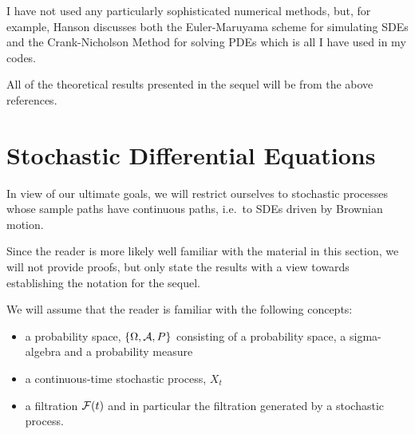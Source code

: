 \documentclass{article}
\begin{document}
I have not used any particularly sophisticated numerical
methods, but, for example, Hanson \cite{Hanson2007} discusses both the
Euler-Maruyama scheme for simulating SDEs and the Crank-Nicholson Method for
solving PDEs which is all I have used in my codes.

All of the theoretical results presented in the sequel will be from
the above references. 

\section{Stochastic Differential Equations}
In view of our ultimate goals, we will restrict ourselves to  stochastic
processes whose sample paths have continuous paths, i.e.\ to SDEs driven by
Brownian motion. 

Since the reader is more likely well familiar with the material in this section,
we will not provide proofs, but only state the results with a view towards
establishing the notation for the sequel.

We will assume that the reader is familiar with the following concepts:
\begin{itemize} 
  \item a probability space, $\{{\Omega}, { \mathcal{A} }, P\}$ consisting of a
  probability space, a sigma-algebra and a probability measure
  \item a continuous-time stochastic process, $X_t$
  \item a filtration ${\mathcal{F}}(t)$ and in particular the filtration generated by a
  stochastic process.
\end{itemize}
\end{document}
